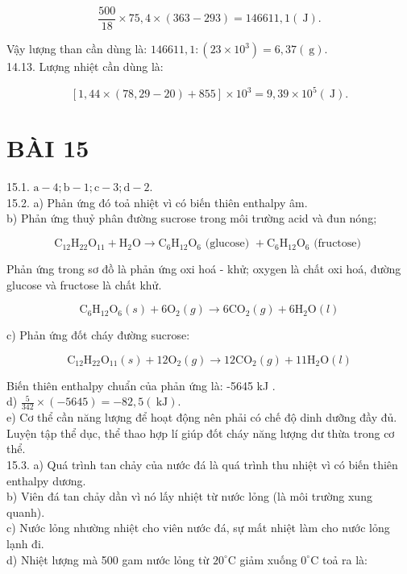 \documentclass[10pt]{article}
\begin{document}
$$
\frac{500}{18} \times 75,4 \times(363-293)=146611,1(\mathrm{~J}) .
$$

Vậy lượng than cần dùng là: $146611,1:\left(23 \times 10^{3}\right)=6,37(\mathrm{~g})$.\\
14.13. Lượng nhiệt cần dùng là:

$$
[1,44 \times(78,29-20)+855] \times 10^{3}=9,39 \times 10^{5}(\mathrm{~J}) .
$$

\section*{BÀI 15}
15.1. $\mathrm{a}-4 ; \mathrm{b}-1 ; \mathrm{c}-3 ; \mathrm{d}-2$.\\
15.2. a) Phản ứng đó toả nhiệt vì có biến thiên enthalpy âm.\\
b) Phản ứng thuỷ phân đường sucrose trong môi trường acid và đun nóng;

$$
\mathrm{C}_{12} \mathrm{H}_{22} \mathrm{O}_{11}+\mathrm{H}_{2} \mathrm{O} \rightarrow \mathrm{C}_{6} \mathrm{H}_{12} \mathrm{O}_{6} \text { (glucose) }+\mathrm{C}_{6} \mathrm{H}_{12} \mathrm{O}_{6} \text { (fructose) }
$$

Phản ứng trong sơ đồ là phản ứng oxi hoá - khử; oxygen là chất oxi hoá, đường glucose và fructose là chất khử.

$$
\mathrm{C}_{6} \mathrm{H}_{12} \mathrm{O}_{6}(s)+6 \mathrm{O}_{2}(g) \rightarrow 6 \mathrm{CO}_{2}(g)+6 \mathrm{H}_{2} \mathrm{O}(l)
$$

c) Phản ứng đốt cháy đường sucrose:

$$
\mathrm{C}_{12} \mathrm{H}_{22} \mathrm{O}_{11}(s)+12 \mathrm{O}_{2}(g) \rightarrow 12 \mathrm{CO}_{2}(g)+11 \mathrm{H}_{2} \mathrm{O}(l)
$$

Biến thiên enthalpy chuẩn của phản ứng là: -5645 kJ .\\
d) $\frac{5}{342} \times(-5645)=-82,5(\mathrm{~kJ})$.\\
e) Cơ thể cần năng lượng để hoạt động nên phải có chế độ dinh dưỡng đầy đủ. Luyện tập thể dục, thể thao hợp lí giúp đốt cháy năng lượng dư thừa trong cơ thể.\\
15.3. a) Quá trình tan chảy của nước đá là quá trình thu nhiệt vì có biến thiên enthalpy dương.\\
b) Viên đá tan chảy dần vì nó lấy nhiệt từ nước lỏng (là môi trường xung quanh).\\
c) Nước lỏng nhường nhiệt cho viên nước đá, sự mất nhiệt làm cho nước lỏng lạnh đi.\\
d) Nhiệt lượng mà 500 gam nước lỏng từ $20^{\circ} \mathrm{C}$ giảm xuống $0^{\circ} \mathrm{C}$ toả ra là:
\end{document}

